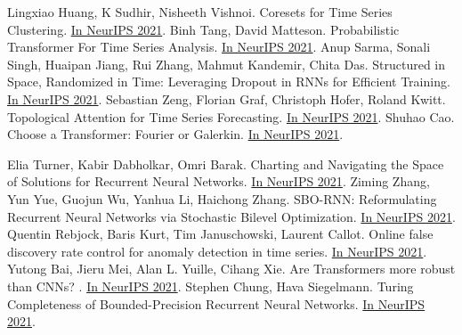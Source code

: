 \documentclass[b5paper,xelatex,ja=standard,10pt]{bxjsarticle}
\begin{document}
\begin{thebibliography}{99}
     Lingxiao Huang, K Sudhir, Nisheeth Vishnoi. Coresets for Time Series Clustering. {\href{https://proceedings.neurips.cc/paper/2021/hash/c115ba9e04ab27fbbb664f932112246d-Abstract.html}{In NeurIPS 2021}}.
     Binh Tang, David Matteson. Probabilistic Transformer For Time Series Analysis. {\href{https://proceedings.neurips.cc/paper/2021/hash/c68bd9055776bf38d8fc43c0ed283678-Abstract.html}{In NeurIPS 2021}}.
     Anup Sarma, Sonali Singh, Huaipan Jiang, Rui Zhang, Mahmut Kandemir, Chita Das. Structured in Space, Randomized in Time: Leveraging Dropout in RNNs for Efficient Training. {\href{https://proceedings.neurips.cc/paper/2021/hash/cd81cfd0a3397761fac44ddbe5ec3349-Abstract.html}{In NeurIPS 2021}}.
     Sebastian Zeng, Florian Graf, Christoph Hofer, Roland Kwitt. Topological Attention for Time Series Forecasting. {\href{https://proceedings.neurips.cc/paper/2021/hash/d062f3e278a1fbba2303ff5a22e8c75e-Abstract.html}{In NeurIPS 2021}}.
     Shuhao Cao. Choose a Transformer: Fourier or Galerkin. {\href{https://proceedings.neurips.cc/paper/2021/hash/d0921d442ee91b896ad95059d13df618-Abstract.html}{In NeurIPS 2021}}.

     Elia Turner, Kabir Dabholkar, Omri Barak. Charting and Navigating the Space of Solutions for Recurrent Neural Networks. {\href{https://proceedings.neurips.cc/paper/2021/hash/d530d454337fb09964237fecb4bea6ce-Abstract.html}{In NeurIPS 2021}}.
     Ziming Zhang, Yun Yue, Guojun Wu, Yanhua Li, Haichong Zhang. SBO-RNN: Reformulating Recurrent Neural Networks via Stochastic Bilevel Optimization. {\href{https://proceedings.neurips.cc/paper/2021/hash/d87ca511e2a8593c8039ef732f5bffed-Abstract.html}{In NeurIPS 2021}}.
     Quentin Rebjock, Baris Kurt, Tim Januschowski, Laurent Callot. Online false discovery rate control for anomaly detection in time series. {\href{https://proceedings.neurips.cc/paper/2021/hash/def130d0b67eb38b7a8f4e7121ed432c-Abstract.html}{In NeurIPS 2021}}.
     Yutong Bai, Jieru Mei, Alan L. Yuille, Cihang Xie. Are Transformers more robust than CNNs? . {\href{https://proceedings.neurips.cc/paper/2021/hash/e19347e1c3ca0c0b97de5fb3b690855a-Abstract.html}{In NeurIPS 2021}}.
     Stephen Chung, Hava Siegelmann. Turing Completeness of Bounded-Precision Recurrent Neural Networks. {\href{https://proceedings.neurips.cc/paper/2021/hash/ef452c63f81d0105dd4486f775adec81-Abstract.html}{In NeurIPS 2021}}.


\end{thebibliography}
\end{document}
